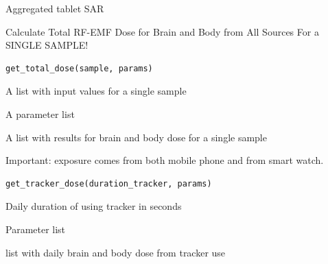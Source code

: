 \documentclass[a4paper]{book}
\begin{document}
%
\begin{Value}
Aggregated tablet SAR
\end{Value}
%
\begin{Description}
Calculate Total RF-EMF Dose for Brain and Body from All Sources
For a SINGLE SAMPLE!
\end{Description}
%
\begin{Usage}
\begin{verbatim}
get_total_dose(sample, params)
\end{verbatim}
\end{Usage}
%
\begin{Arguments}
\begin{ldescription}
\item[\code{sample}] A list with input values for a single sample

\item[\code{params}] A parameter list
\end{ldescription}
\end{Arguments}
%
\begin{Value}
A list with results for brain and body dose for a single sample
\end{Value}
%
\begin{Description}
Important: exposure comes from both mobile phone and from smart watch.
\end{Description}
%
\begin{Usage}
\begin{verbatim}
get_tracker_dose(duration_tracker, params)
\end{verbatim}
\end{Usage}
%
\begin{Arguments}
\begin{ldescription}
\item[\code{duration\_tracker}] Daily duration of using tracker in seconds

\item[\code{params}] Parameter list
\end{ldescription}
\end{Arguments}
%
\begin{Value}
list with daily brain and body dose from tracker use
\end{Value}
\end{document}
